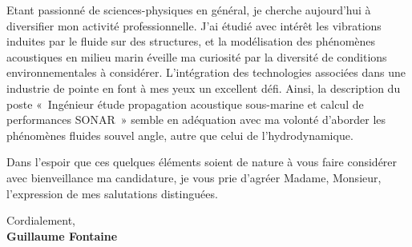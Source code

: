\documentclass[11pt]{article}
\begin{document}
Etant passionné de sciences-physiques en général, je cherche aujourd'hui à diversifier mon activité professionnelle. J'ai étudié avec intérêt les vibrations induites par le fluide sur des structures, et la modélisation des phénomènes acoustiques en milieu marin éveille ma curiosité par la diversité de conditions environnementales à considérer. L'intégration des technologies associées dans une industrie de pointe en font à mes yeux un excellent défi. Ainsi, la description du poste « Ingénieur étude propagation acoustique sous-marine et calcul de performances SONAR » semble en adéquation avec ma volonté d'aborder les phénomènes fluides souvel angle, autre que celui de l'hydrodynamique. 

Dans l’espoir que ces quelques éléments soient de nature à vous faire considérer avec bienveillance ma candidature, je vous prie d’agréer Madame, Monsieur, l’expression de mes salutations distinguées.

Cordialement,\\[2em] %
%
{\bfseries Guillaume Fontaine}\\
%

\vfill%
\end{document}
